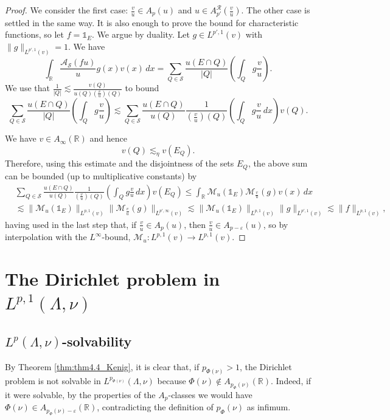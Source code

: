 \documentclass[12pt]{amsart}
\newcommand{\R}{\mathbb{R}}
\theoremstyle{plain}
\theoremstyle{definition}
\numberwithin{equation}{section}
\begin{document}
\begin{proof}
    We consider the first case: $\frac{v}{u}\in A_p(u)$ and $u\in A_{p'}^{\mathcal{R}}(\frac{v}{u})$. The other case is settled in the same way. It is also enough to prove the bound for characteristic functions, so let $f=\mathds{1}_{E}$. We argue by duality. Let $g\in L^{p',1}(v)$ with $\|g\|_{L^{p',1}(v)}=1$. We have
    \[
        \int_{\R}\frac{\mathcal{A}_{\mathcal{S}}(fu)}{u}g(x)v(x)\, dx
        =
        \sum_{Q\in\mathcal{S}}\frac{u(E\cap Q)}{|Q|}\left(\int_{Q} g\frac{v}{u}\right).
    \]
    We use that $\frac{1}{|Q|}\lesssim \frac{v(Q)}{u(Q)\left(\frac{v}{u}\right)(Q)}$ to bound
    \[
    \sum_{Q\in\mathcal{S}}\frac{u(E\cap Q)}{|Q|}\left(\int_{Q} g\frac{v}{u}\right)
    \lesssim 
    \sum_{Q\in\mathcal{S}}\frac{u(E\cap Q)}{u(Q)}\frac{1}{\left(\frac{v}{u}\right)(Q)}\left(\int_{Q}g\frac{v}{u}\, dx\right)v(Q).
    \]
    
    We have $v\in A_{\infty}(\R)$ and hence
     \[
    v(Q)  \lesssim_{\eta}
    v(E_Q).
    \]
    Therefore, using this estimate and the disjointness of the sets $E_Q$, the above sum can be bounded (up to multiplicative constants) by
    \begin{align*}
       &\sum_{Q\in\mathcal{S}}\frac{u(E\cap Q)}{u(Q)}\frac{1}{\left(\frac{v}{u}\right)(Q)}\left(\int_{Q}g\frac{v}{u}\, dx\right)v(E_Q)
        \leq 
        \int_{\R}\mathcal{M}_{u}(\mathds{1}_E)\mathcal{M}_{\frac{v}{u}}(g)v(x)\, dx
          \\&\lesssim 
        \|\mathcal{M}_{u}(\mathds{1}_{E})\|_{L^{p,1}(v)}\|\mathcal{M}_{\frac{v}{u}}(g)\|_{L^{p',\infty}(v)}
      \lesssim 
        \|\mathcal{M}_{u}(\mathds{1}_{E})\|_{L^{p,1}(v)}\|g\|_{L^{p',1}(v)}
        \lesssim 
        \|f\|_{L^{p,1}(v)},
    \end{align*}
    having used in the last step that, if $\frac{v}{u}\in A_{p}(u)$, then $\frac{v}{u}\in A_{p-\varepsilon}(u)$, so by interpolation with the $L^{\infty}$-bound, $\mathcal{M}_{u}\colon L^{p,1}(v)\to L^{p,1}(v)$.\qedhere
\end{proof}








\section{The Dirichlet problem in \texorpdfstring{$L^{p,1}(\Lambda,\nu)$}{}}


\subsection{\texorpdfstring{$L^{p}(\Lambda,\nu)$}{}-solvability}
By Theorem \ref{thm:thm4.4_Kenig}, it is clear that,  if $p_{\Phi(\nu)}>1$,  the Dirichlet problem is not solvable in $L^{p_{\Phi(\nu)}}(\Lambda, \nu)$ because $\Phi(\nu)\not\in A_{p_{\Phi}(\nu)}(\R)$. Indeed, if it were solvable, by the properties of the $A_p$-classes we would have $\Phi(\nu)\in A_{p_{\Phi}(\nu)-\varepsilon}(\R)$, contradicting the definition of $p_{\Phi}(\nu)$ as infimum.
\end{document}
